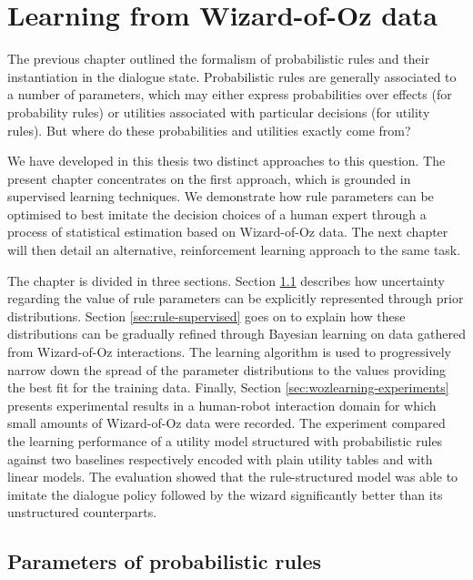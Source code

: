
\chapter{Learning from Wizard-of-Oz data}
\label{chap:wozlearning}

The previous chapter outlined the formalism of probabilistic rules and their instantiation in the dialogue state. Probabilistic rules are generally associated to a number of parameters, which may either express probabilities over effects (for probability rules) or utilities associated with particular decisions (for utility rules). But where do these probabilities and utilities exactly come from?

We have developed in this thesis two distinct approaches to this question. The present chapter concentrates on the first approach, which is grounded in supervised learning techniques. We demonstrate how rule parameters can be optimised to best imitate the decision choices of a human expert through a process of statistical estimation based on Wizard-of-Oz data. The next chapter will then detail an alternative, reinforcement learning approach to the same task.

The chapter is divided in three sections.  Section \ref{sec:rule-params} describes how uncertainty regarding the value of rule parameters can be explicitly represented through prior distributions. Section \ref{sec:rule-supervised} goes on to explain how these distributions can be gradually refined through Bayesian learning on data gathered from Wizard-of-Oz interactions.  The learning algorithm  is used to progressively narrow down the spread of the parameter distributions to the values providing the best fit for the training data. Finally, Section \ref{sec:wozlearning-experiments} presents experimental results in a human-robot interaction domain for which small amounts of Wizard-of-Oz data were recorded. The experiment compared the learning performance of a utility model structured with probabilistic rules against two baselines respectively encoded with plain utility tables and with linear models. The evaluation showed that the rule-structured model was able to imitate the dialogue policy followed by the wizard significantly better than its unstructured counterparts.

\section{Parameters of probabilistic rules}
\label{sec:rule-params}

